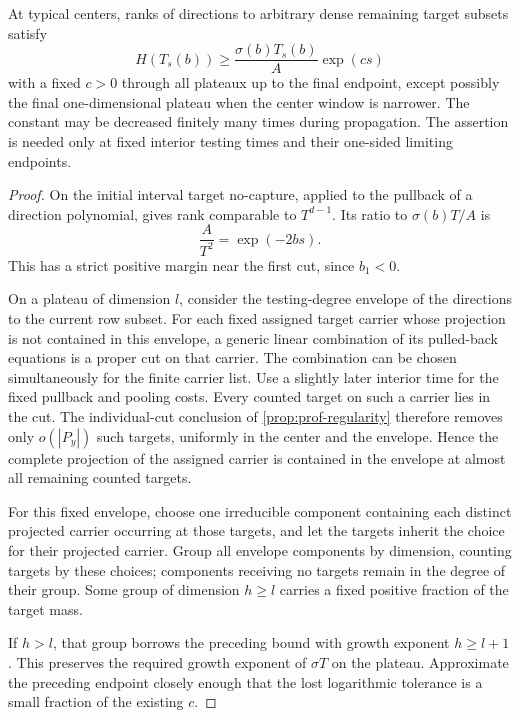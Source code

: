 \begin{lemma}\label{lem:sc-separated-rank}
At typical centers, ranks of directions to arbitrary dense remaining target subsets satisfy
\begin{equation}\label{eq:sc-strict-rank}
 H(T_s(b))\ge\frac{\sigma(b)T_s(b)}A\exp(c s)
\end{equation}
with a fixed $c>0$ through all plateaux up to the final endpoint, except possibly the final one-dimensional plateau when the center window is narrower.  The constant may be decreased finitely many times during propagation. The assertion is needed only at fixed interior testing times and their one-sided limiting endpoints.
\end{lemma}

\begin{proof}
On the initial interval target no-capture, applied to the pullback of a direction polynomial, gives rank comparable to $T^{d-1}$.  Its ratio to $\sigma(b)T/A$ is
\[
 \frac{A}{T^2}=\exp(-2bs).
\]
This has a strict positive margin near the first cut, since $b_1<0$.

On a plateau of dimension $l$, consider the testing-degree envelope of the directions to the current row subset.  For each fixed assigned target carrier whose projection is not contained in this envelope, a generic linear combination of its pulled-back equations is a proper cut on that carrier.  The combination can be chosen simultaneously for the finite carrier list.  Use a slightly later interior time for the fixed pullback and pooling costs.  Every counted target on such a carrier lies in the cut.  The individual-cut conclusion of \cref{prop:prof-regularity} therefore removes only $o(|P_y|)$ such targets, uniformly in the center and the envelope.  Hence the complete projection of the assigned carrier is contained in the envelope at almost all remaining counted targets.

For this fixed envelope, choose one irreducible component containing each distinct projected carrier occurring at those targets, and let the targets inherit the choice for their projected carrier.  Group all envelope components by dimension, counting targets by these choices; components receiving no targets remain in the degree of their group.  Some group of dimension $h\ge l$ carries a fixed positive fraction of the target mass.

If $h>l$, that group borrows the preceding bound with growth exponent $h\ge l+1$.  This preserves the required growth exponent of $\sigma T$ on the plateau.  Approximate the preceding endpoint closely enough that the lost logarithmic tolerance is a small fraction of the existing $c$.


\end{proof}
